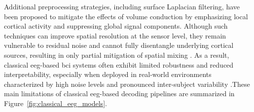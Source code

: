 Additional preprocessing strategies, including surface Laplacian filtering, have been proposed to mitigate the effects of volume conduction by emphasizing local cortical activity and suppressing global signal components. Although such techniques can improve spatial resolution at the sensor level, they remain vulnerable to residual noise and cannot fully disentangle underlying cortical sources, resulting in only partial mitigation of spatial mixing \cite{wang2019eeg,pan2025enhancing}. As a result, classical \gls{eeg}-based \gls{bci} systems often exhibit limited robustness and reduced interpretability, especially when deployed in real-world environments characterized by high noise levels and pronounced inter-subject variability \cite{bouazizi2024interpretability}.{These main limitations of classical \gls{eeg}-based decoding pipelines are summarized in Figure~\ref{fig:classical_eeg_models}.}










